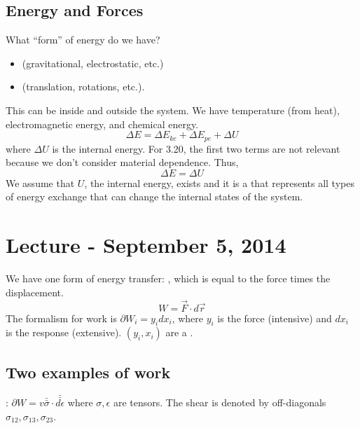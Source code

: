 \documentclass[12pt]{article}
\begin{document}
\subsection{Energy and Forces}
What ``form'' of energy do we have?
\begin{itemize}
\item {} (gravitational, electrostatic, etc.)
\item {} (translation, rotations, etc.).  
\end{itemize}
This can be inside and outside the system.  We have temperature (from heat), electromagnetic energy, and chemical energy.
\begin{equation}
\Delta E = \Delta E_{ke} + \Delta E_{pe} + \Delta U
\end{equation}
where $\Delta U$ is the internal energy.  For 3.20, the first two terms are not relevant because we don't consider material dependence.  Thus,
\begin{equation}
\Delta E = \Delta U
\end{equation}
We assume that $U$, the internal energy, exists and it is a  that represents all types of energy exchange that can change the internal states of the system.

\section{Lecture - September 5, 2014}
We have one form of energy transfer: , which is equal to the force times the displacement.
\begin{equation}
W = \vec{F} \cdot d\vec{r}
\end{equation}
The formalism for work is $\partial W_i = y_i dx_i$, where $y_i$ is the force (intensive) and $dx_i$ is the response (extensive).  $(y_i, x_i)$ are a .
\subsection{Two examples of work}
: $\partial W = v \bar{\bar{\sigma}} \cdot \bar{\bar{d\epsilon}}$ where $\sigma, \epsilon$ are tensors.  The shear  is denoted by off-diagonals $\sigma_{12}, \sigma_{13}, \sigma_{23}$.\\
\end{document}
